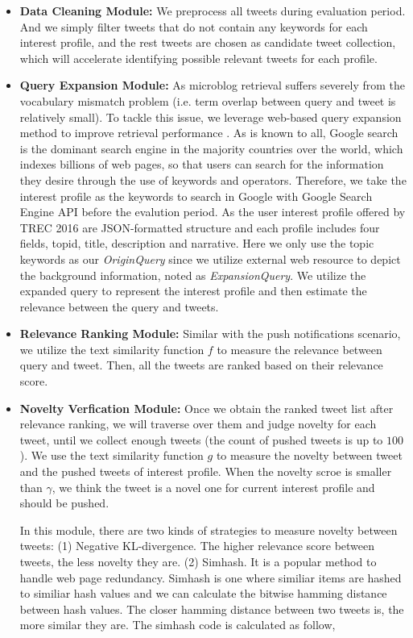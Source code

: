 \begin{itemize}
\item \textbf{Data Cleaning Module:}
We preprocess all tweets during evaluation period.
And we simply filter tweets that do not contain any keywords for each interest profile,
and the rest tweets are chosen as candidate tweet collection,
which will accelerate identifying possible relevant tweets for each profile.

\item \textbf{Query Expansion Module:}
As microblog retrieval suffers severely from the vocabulary mismatch problem
(i.e. term overlap between query and tweet is relatively small).
To tackle this issue, we leverage web-based query expansion method to improve retrieval performance
\cite{zhai2011mbfb}.
As is known to all, Google search is the dominant search engine in the majority countries
over the world, which indexes billions\cite{arlington2008google} of web pages,
so that users can search for the information they desire through the use of keywords and operators.
Therefore, we take the interest profile as the keywords to search in Google with Google Search Engine API before the evalution period.
As the user interest profile offered by TREC 2016 are JSON-formatted structure and each profile includes four fields, topid, title, description and narrative.
Here we only use the topic keywords as our \emph{OriginQuery} since we utilize external web resource to depict the background information, noted as \emph{ExpansionQuery}.
We utilize the expanded query to represent the interest profile and then estimate the relevance between the query and tweets.

\item \textbf{Relevance Ranking Module:}
Similar with the push notifications scenario,
we utilize the text similarity function $f$ to measure the relevance between query and tweet.
Then, all the tweets are ranked based on their relevance score.

\item \textbf{Novelty Verfication Module:}
Once we obtain the ranked tweet list after relevance ranking,
we will traverse over them and judge novelty for each tweet,
until we collect enough tweets (the count of pushed tweets is up to $100$).
We use the text similarity function $g$ to measure the novelty between tweet
and the pushed tweets of interest profile.
When the novelty scroe is smaller than $\gamma$,
we think the tweet is a novel one for current interest profile and should be pushed.

In this module, there are two kinds of strategies to measure novelty between tweets:
(1) Negative KL-divergence. The higher relevance score between tweets, the less novelty they are.
(2) Simhash. It is a popular method to handle web page redundancy\cite{charikar2002similarity}.
Simhash is one where similiar items are hashed to similiar hash values
and we can calculate the bitwise hamming distance between hash values.
The closer hamming distance between two tweets is, the more similar they are.
The simhash code is calculated as follow,


\end{itemize}
